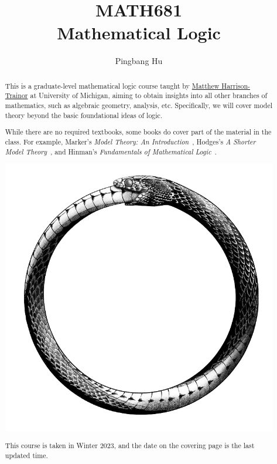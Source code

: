 \documentclass[a4paper]{report}
\author{Pingbang Hu}
\title{MATH681\\Mathematical Logic}
\begin{document}
\maketitle

\begin{abstract}
	This is a graduate-level mathematical logic course taught by \href{http://www-personal.umich.edu/~matthhar/}{Matthew Harrison-Trainor} at University of Michigan, aiming to obtain insights into all other branches of mathematics, such as algebraic geometry, analysis, etc. Specifically, we will cover model theory beyond the basic foundational ideas of logic.

	While there are no required textbooks, some books do cover part of the material in the class. For example, Marker's \emph{Model Theory: An Introduction}~\cite{marker2002model}, Hodges's \emph{A Shorter Model Theory}~\cite{hodges1997shorter}, and Hinman's \emph{Fundamentals of Mathematical Logic}~\cite{hinman2005fundamentals}.

	\vfill
	\begin{center}
		\includegraphics[width=.8\linewidth]{Figures/cover.png}
	\end{center}
	\vfill
	This course is taken in Winter 2023, and the date on the covering page is the last updated time.
\end{abstract}

\tableofcontents


\newpage
\appendix
\appendixpage{}



\newpage
\printbibliography{}
\end{document}
